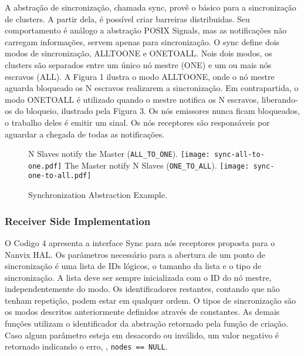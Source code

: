 			A abstração de sincronização, chamada sync, provê o básico para a sincronização de clusters.
			A partir dela, é possível criar barreiras distribuidas.
			Seu comportamento é análogo a abstração POSIX Signals, mas as notificações não carregam informações, servem apenas para sincronização.
			O sync define dois modos de sincronização, ALLTOONE e ONETOALL.
			Nois dois modos, os clusters são separados entre um único nó mestre (ONE) e um ou mais nós escravos (ALL).
			A Figura 1 ilustra o modo ALLTOONE, onde o nó mestre aguarda bloqueado os N escravos realizarem a sincronização.
			Em contrapartida, o modo ONETOALL é utilizado quando o mestre notifica os N escravos, liberando-os do bloqueio, ilustrado pela Figura 3.
			Os nós emissores nunca ficam bloqueados, o trabalho deles é emitir um sinal.
			Os nós receptores são responsáveis por aguardar a chegada de todas as notificações.

			\begin{figure}[!tb]
				\centering%
				\caption{Synchronization Abstraction Example.}%
				\label{fig:sync-concepts}%

					{N Slaves notify the Master (\texttt{ALL\_TO\_ONE}).}%
					{\texttt{[image: sync-all-to-one.pdf]}}%
				\hfill
					{The Master notify N Slaves (\texttt{ONE\_TO\_ALL}).}%
					{\texttt{[image: sync-one-to-all.pdf]}}%

			\end{figure}

			\subsubsection{Receiver Side Implementation}

				O Codigo 4 apresenta a interface Sync para nós receptores proposta para o Nanvix HAL.
				Os parâmetros necessário para a abertura de um ponto de sincronização é uma lista de IDs lógicos, o tamanho da lista e o tipo de sincronização.
				A lista deve ser sempre inicializada com o ID do nó mestre, independentemente do modo.
				Os identificadores restantes, contando que não tenham repetição, podem estar em qualquer ordem.
				O tipos de sincronização são os modos descritos anteriormente definidos através de constantes.
				As demais funções utilizam o identificador da abstração retornado pela função de criação.
				Caso algum parâmetro esteja em desacordo ou inválido, um valor negativo é retornado indicando o erro, \eg, \texttt{nodes == NULL}.

